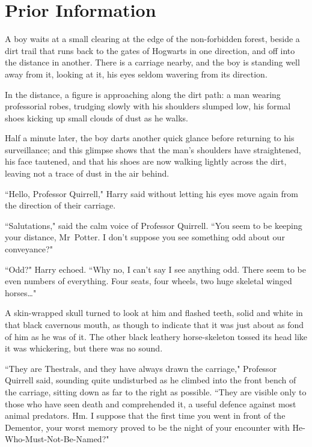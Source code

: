 \chapter{Prior Information}

\lettrine{A}{} boy waits at a small clearing at the edge of the non-forbidden forest, beside a dirt trail that runs back to the gates of Hogwarts in one direction, and off into the distance in another. There is a carriage nearby, and the boy is standing well away from it, looking at it, his eyes seldom wavering from its direction.

In the distance, a figure is approaching along the dirt path: a man wearing professorial robes, trudging slowly with his shoulders slumped low, his formal shoes kicking up small clouds of dust as he walks.

Half a minute later, the boy darts another quick glance before returning to his surveillance; and this glimpse shows that the man's shoulders have straightened, his face tautened, and that his shoes are now walking lightly across the dirt, leaving not a trace of dust in the air behind.

``Hello, Professor Quirrell," Harry said without letting his eyes move again from the direction of their carriage.

``Salutations," said the calm voice of Professor Quirrell. ``You seem to be keeping your distance, Mr~Potter. I don't suppose you see something odd about our conveyance?"

``Odd?" Harry echoed. ``Why no, I can't say I see anything odd. There seem to be even numbers of everything. Four seats, four wheels, two huge skeletal winged horses{\ldots}"

A skin-wrapped skull turned to look at him and flashed teeth, solid and white in that black cavernous mouth, as though to indicate that it was just about as fond of him as he was of it. The other black leathery horse-skeleton tossed its head like it was whickering, but there was no sound.

``They are Thestrals, and they have always drawn the carriage," Professor Quirrell said, sounding quite undisturbed as he climbed into the front bench of the carriage, sitting down as far to the right as possible. ``They are visible only to those who have seen death and comprehended it, a useful defence against most animal predators. Hm. I suppose that the first time you went in front of the Dementor, your worst memory proved to be the night of your encounter with He-Who-Must-Not-Be-Named?"

